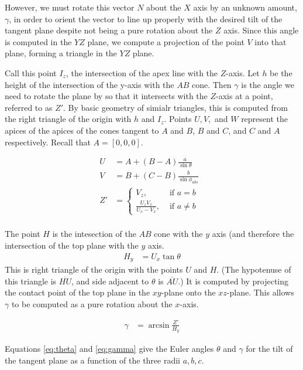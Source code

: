 \documentclass{article}
\begin{document}
However, we must rotate this vector $N$ about the $X$ axis by an unknown amount, $\gamma$, in order
to orient the vector to line up properly with the
desired tilt of the tangent plane despite not being a pure rotation about the $Z$ axis.
Since this angle is computed in the $YZ$ plane, we compute a projection of the point $V$ into
that plane, forming a triangle in the $YZ$ plane.

Call this point $I_z$, the intersection
of the apex line with the $Z$-axis. Let $h$ be the height of the intersection of the y-axis with the $AB$ cone.
Then $\gamma$ is the angle we need to rotate the plane by so that it intersects with the
$Z$-axis at a point, referred to as $Z'$.
By basic geometry of simialr triangles, this is computed from the right triangle of the origin with $h$ and $I_z$.
Points $U, V, $ and $W$ represent the apices of the apices of the cones tangent to $A$ and $B$, $B$ and $C$,
and $C$ and $A$ respectively. Recall that $A = [0,0,0]$.

\begin{align}
  U &= A + (B-A) \frac{a}{\sin{\theta}} \\
  V &= B + (C-B) \frac{b}{\sin{\phi_{abs}}} \\
  Z'&= \begin{cases}
    V_z, & \text{ if $a = b$ } \\
    \frac{U_z V_x}{U_x - V_x}, & \text{ if  $a \neq b$}
  \end{cases}
  \label{eq:zprime} \\
\end{align}

The point $H$ is the intesection of the $AB$ cone with the $y$ axis (and therefore the intersection
of the top plane with the $y$ axis.
\begin{align}
  H_y &= U_x \tan{\theta}
\end{align}
This is right triangle of the origin with the points $U$ and $H$. (The hypotenuse
of this triangle is $\overline{HU}$, and side adjacent to $\theta$ is $\overline{AU}$.)
It is computed by projecting the contact point of the top plane in the $xy$-plane
onto the $xz$-plane. This allows $\gamma$ to be computed as a pure rotation
about the $x$-axis.

\begin{align}
  \gamma &= \arcsin{\frac{Z'}{H_y}} \label{eq:gamma}
\end{align}

Equations \ref{eq:theta} and \ref{eq:gamma} give the Euler angles
$\theta$ and $\gamma$
for the tilt of the
tangent plane as a function of the three radii $a,b,c$.
\end{document}
